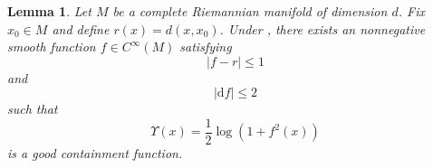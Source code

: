 \documentclass[a4paper]{article}
\numberwithin{equation}{section}
\newtheorem{lemma}[theorem]{Lemma}
\theoremstyle{definition}
\begin{document}
\begin{lemma}\label{lem_fr}
    Let $M$ be a complete Riemannian manifold of dimension $d$. Fix $x_0\in M$ and define $r(x)=d(x,x_0)$. Under , there 
    exists an nonnegative smooth function $f\in C^\infty(M)$ satisfying   
\begin{equation}\label{eqn_fand_r}
        |f-r|\leq 1
    \end{equation}
    and
\begin{equation}\label{eqn_uniform_bound}
        |\mathrm{d}f|\leq 2
    \end{equation}
    such that 
\begin{equation}\label{eqn_Upsilon}
\Upsilon(x)=\frac{1}{2}\log(1+f^2(x)) 
\end{equation}
is a good containment function.
\end{lemma}
\end{document}
